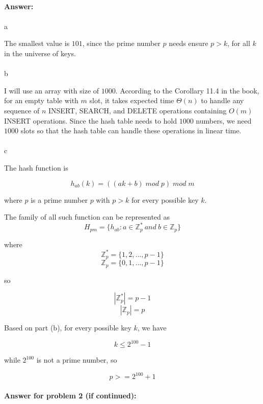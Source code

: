 \documentclass{article}
\begin{document}
\paragraph{Answer:}
\paragraph{}
a

The smallest value is $101$, since the prime number $p$ needs ensure $p>k$, for all $k$ in the universe of keys.

\paragraph{}
b

I will use an array with size of $1000$. According to the Corollary 11.4 in the book, for an empty table with $m$ slot, it takes expected time $\Theta(n)$ to handle any sequence of $n$ INSERT, SEARCH, and DELETE operations containing $O(m)$ INSERT operations. Since the hash table needs to hold $1000$ numbers, we need $1000$ slots so that the hash table can handle these operations in linear time.

\paragraph{}
c

The hash function is

$$
h_{ab}(k)=((ak+b) \; mod \; p) \; mod \;m
$$

where $p$ is a prime number $p$ with $p>k$ for every possible key $k$.

The family of all such function can be represented as
$$
H_{pm}=\{ h_{ab} : a \in \mathbb{Z}^{*}_p ~ and ~ b \in \mathbb{Z}_p \}
$$

where
$$
\mathbb{Z}^{*}_p = \{1,2,\dots,p-1\}
$$
$$
\mathbb{Z}_p = \{0,1,\dots,p-1\}
$$

so

$$
|\mathbb{Z}^{*}_p| = p - 1
$$
$$
|\mathbb{Z}_p| = p
$$

Based on part (b), for every possible key $k$, we have

$$
k \leq 2^{100}-1
$$

while $2^{100}$ is not a prime number, so

$$
p >= 2^{100} + 1
$$
\newpage
\paragraph{Answer for problem 2 (if continued):}
\end{document}
